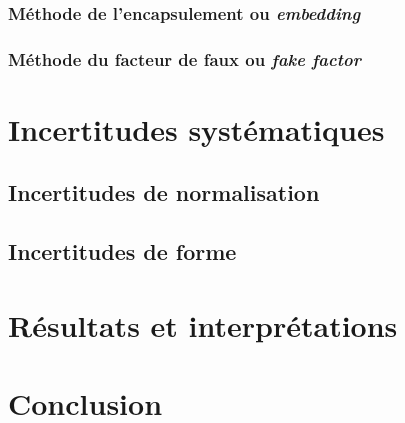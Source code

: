 \subsubsection{Méthode de l'encapsulement ou \emph{embedding}}\label{chapter-HTT_analysis-section-bg_estimation-subsec-data-subsubsec-embedding}
\subsubsection{Méthode du facteur de faux ou \emph{fake factor}}\label{chapter-HTT_analysis-section-bg_estimation-subsec-data-subsubsec-FF_method}

\section{Incertitudes systématiques}\label{chapter-HTT_analysis-section-systematics}
\subsection{Incertitudes de normalisation}\label{chapter-HTT_analysis-section-systematics-subsec-normalisation}
\subsection{Incertitudes de forme}\label{chapter-HTT_analysis-section-systematics-subsec-shape}

\section{Résultats et interprétations}\label{chapter-HTT_analysis-section-results}

\section{Conclusion}\label{chapter-HTT_analysis-section-conclusion}
